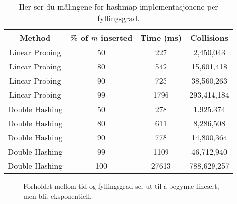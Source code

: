 \documentclass[12pt,a4paper]{article}
\begin{document}
\begin{table}[H]
    \centering
    \caption{Her ser du målingene for hashmap implementasjonene per fyllingsgrad.}
    \label{table:performance}
    \begin{tabular}{|c|c|c|c|}
    \hline
    Method & \% of \( m \) inserted & Time (ms) & Collisions \\
    \hline
    \hline
    Linear Probing & 50 & 227 & 2,450,043 \\
    Linear Probing & 80 & 542 & 15,601,418 \\
    Linear Probing & 90 & 723 & 38,560,263 \\
    Linear Probing & 99 & 1796 & 293,414,184 \\
    \hline
    Double Hashing & 50 & 278 & 1,925,374 \\
    Double Hashing & 80 & 611 & 8,286,508 \\
    Double Hashing & 90 & 778 & 14,800,364 \\
    Double Hashing & 99 & 1109 & 46,712,940 \\
    Double Hashing & 100 & 27613 & 788,629,257 \\
    \hline
    \end{tabular}
\end{table}

\begin{figure}[H]
    \centering
    \caption{Forholdet mellom tid og fyllingsgrad ser ut til å begynne lineært, men blir eksponentiell.}
    \end{figure}
    
\end{document}
